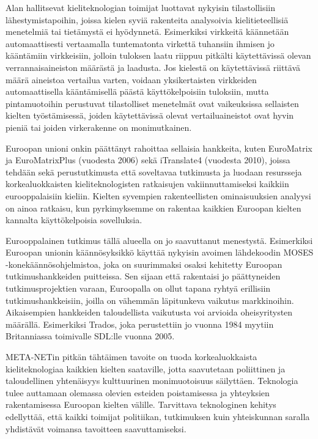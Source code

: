 \documentclass[]{../../metanetpaper}
\begin{document}
\begin{Parallel}[c]{77mm}{77mm}
{Alan hallitsevat kieliteknologian toimijat luottavat nykyisin tilastollisiin
lähestymistapoihin, joissa kielen syviä rakenteita analysoivia
kielitieteellisiä menetelmiä tai tietämystä ei hyödynnetä. Esimerkiksi
virkkeitä käännetään automaattisesti vertaamalla tuntematonta virkettä
tuhansiin ihmisen jo kääntämiin virkkeisiin, jolloin tuloksen laatu riippuu
pitkälti käytettävissä olevan verrannaisaineiston määrästä ja laadusta. Jos
kielestä on käytettävissä riittävä määrä aineistoa vertailua varten, voidaan
yksikertaisten virkkeiden automaattisella kääntämisellä päästä käyttökelpoisiin
tuloksiin, mutta pintamuotoihin perustuvat tilastolliset menetelmät ovat
vaikeuksissa sellaisten kielten työstämisessä, joiden käytettävissä olevat
vertailuaineistot ovat hyvin pieniä tai joiden virkerakenne on monimutkainen.

Euroopan unioni onkin päättänyt rahoittaa sellaisia hankkeita, kuten EuroMatrix
ja EuroMatrixPlus (vuodesta 2006) sekä iTranslate4 (vuodesta 2010), joissa
tehdään sekä perustutkimusta että soveltavaa tutkimusta ja luodaan resursseja
korkealuokkaisten kieliteknologisten ratkaisujen vakiinnuttamiseksi kaikkiin
eurooppalaisiin kieliin. Kielten syvempien rakenteellisten ominaisuuksien
analyysi on ainoa ratkaisu, kun pyrkimyksemme on rakentaa kaikkien Euroopan
kielten kannalta käyttökelpoisia sovelluksia.

Eurooppalainen tutkimus tällä alueella on jo saavuttanut menestystä.
Esimerkiksi Euroopan unionin käännösyksikkö käyttää nykyisin avoimen
lähdekoodin MOSES -konekäännösohjelmistoa, joka on suurimmaksi osaksi kehitetty
Euroopan tutkimushankkeiden puitteissa. Sen sijaan että rakentaisi jo
päättyneiden tutkimusprojektien varaan, Euroopalla on ollut tapana ryhtyä
erillisiin tutkimushankkeisiin, joilla on vähemmän läpitunkeva vaikutus
markkinoihin. Aikaisempien hankkeiden taloudellista vaikutusta voi arvioida
oheisyritysten määrällä. Esimerkiksi Trados, joka perustettiin jo vuonna 1984
myytiin Britanniassa toimivalle SDL:lle vuonna 2005.


META-NETin pitkän tähtäimen tavoite on tuoda korkealuokkaista
kieliteknologiaa kaikkien kielten saataville, jotta saavutetaan
poliittinen ja taloudellinen yhtenäisyys kulttuurinen monimuotoisuus
säilyttäen. Teknologia tulee auttamaan olemassa olevien esteiden
poistamisessa ja yhteyksien rakentamisessa Euroopan kielten
välille. Tarvittava teknologinen kehitys edellyttää, että kaikki
toimijat politiikan, tutkimuksen kuin yhteiskunnan saralla yhdistävät
voimansa tavoitteen saavuttamiseksi.

}
\end{Parallel}
\end{document}
